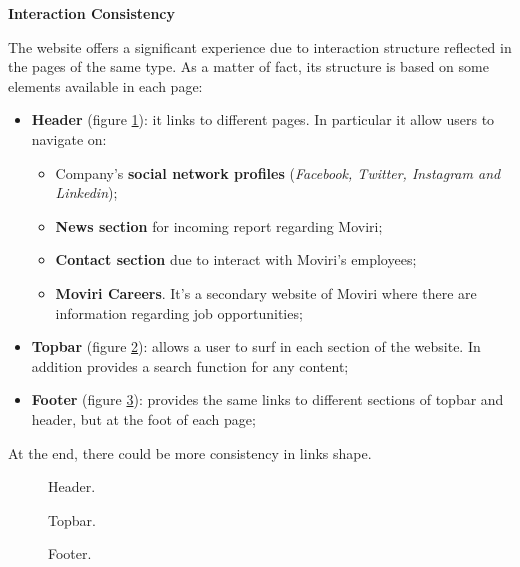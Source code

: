 \textbf{Interaction Consistency}\par
The website offers a significant experience due to interaction structure reflected in the pages of the same type. As a matter of fact, its structure is based on some elements available in each page: 
\begin{itemize}
\item \textbf{Header} (figure \ref{Header}): it links to different pages. In particular it allow users to navigate on:
\begin{itemize}
\item Company's \textbf{social network profiles} (\textit{Facebook, Twitter, Instagram and Linkedin});
\item \textbf{News section} for incoming report regarding Moviri;
\item \textbf{Contact section} due to interact with Moviri's employees;
\item \textbf{Moviri Careers}. It's a secondary website of Moviri where there are information regarding job opportunities;
\end{itemize}
\item \textbf{Topbar} (figure \ref{topbar}): allows a user to surf in each section of the website. In addition provides a search function for any content; 
\item \textbf{Footer} (figure \ref{Footer}): provides the same links to different sections of topbar and header, but at the foot of each page;
\end{itemize}
At the end, there could be more consistency in links shape.	


\begin{figure}[H]
  \centering
  \caption{Header.}
   \label{Header}
\end{figure}

\begin{figure}[H]
  \centering
  \caption{Topbar.}
   \label{topbar}
\end{figure}

\begin{figure}[H]
  \centering
  \caption{Footer.}
   \label{Footer}
\end{figure}
\medskip

